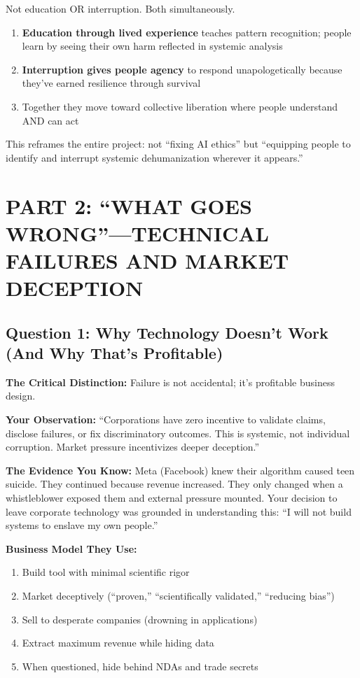 \documentclass[12pt,letterpaper]{article}
\begin{document}
Not education OR interruption. Both simultaneously.

\begin{enumerate}[leftmargin=*,noitemsep]
    \item \textbf{Education through lived experience} teaches pattern recognition; people learn by seeing their own harm reflected in systemic analysis
    \item \textbf{Interruption gives people agency} to respond unapologetically because they've earned resilience through survival
    \item Together they move toward collective liberation where people understand AND can act
\end{enumerate}

This reframes the entire project: not ``fixing AI ethics'' but ``equipping people to identify and interrupt systemic dehumanization wherever it appears.''

\newpage

\section{PART 2: ``WHAT GOES WRONG''---TECHNICAL FAILURES AND MARKET DECEPTION}

\subsection{Question 1: Why Technology Doesn't Work (And Why That's Profitable)}

\textbf{The Critical Distinction:} Failure is not accidental; it's profitable business design.

\begin{livedexperience}
\textbf{Your Observation:} ``Corporations have zero incentive to validate claims, disclose failures, or fix discriminatory outcomes. This is systemic, not individual corruption. Market pressure incentivizes deeper deception.''

\textbf{The Evidence You Know:} Meta (Facebook) knew their algorithm caused teen suicide. They continued because revenue increased. They only changed when a whistleblower exposed them and external pressure mounted. Your decision to leave corporate technology was grounded in understanding this: ``I will not build systems to enslave my own people.''
\end{livedexperience}

\textbf{Business Model They Use:}
\begin{enumerate}[leftmargin=*,noitemsep,font=\small]
    \item Build tool with minimal scientific rigor
    \item Market deceptively (``proven,'' ``scientifically validated,'' ``reducing bias'')
    \item Sell to desperate companies (drowning in applications)
    \item Extract maximum revenue while hiding data
    \item When questioned, hide behind NDAs and trade secrets
\end{enumerate}
\end{document}
